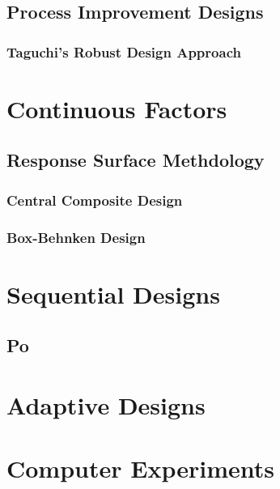 \subsection{Process Improvement Designs}

\subsubsection{Taguchi's Robust Design Approach}



\section{Continuous Factors}



\subsection{Response Surface Methdology}

\subsubsection{Central Composite Design}

\subsubsection{Box-Behnken Design}




\section{Sequential Designs}

\subsection{Po}



\section{Adaptive Designs}



\section{Computer Experiments}

